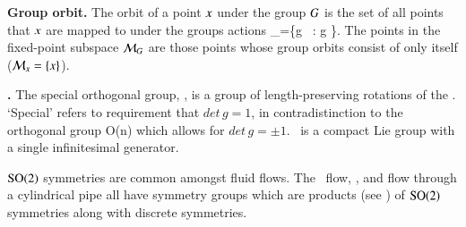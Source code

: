 \begin{definition}
\label{def:grouporbit}
\textbf{Group orbit.}
The orbit of a point $x$ under the group $G$ is the set of all points that $x$ are mapped to under the groups actions
\beq
\pS_\ssp=\{{g} \, \ssp: g \in \Group\}.
\eeq
The points in the fixed-point subspace ${\cal M}_{G}$ are those points whose group orbits consist of only itself (${\cal M}_{x}=\{x\}$).
\end{definition}

\begin{definition}
\label{def:SO2}
\textbf{.} The special orthogonal group, , is a group of length-preserving rotations of the {\statesp}. `Special' refers to requirement that $det \, g = 1$, in contradistinction to the orthogonal group O(n) which allows for $det \, g = \pm 1$. \ is a compact Lie group with a single infinitesimal generator.
\end{definition}

$\textrm{SO}(2)$ symmetries are common amongst fluid flows. The \KS\ flow, {\pCf}, and flow through a cylindrical pipe all have symmetry groups which are products (see ) of $\textrm{SO}(2)$ symmetries along with discrete symmetries.

